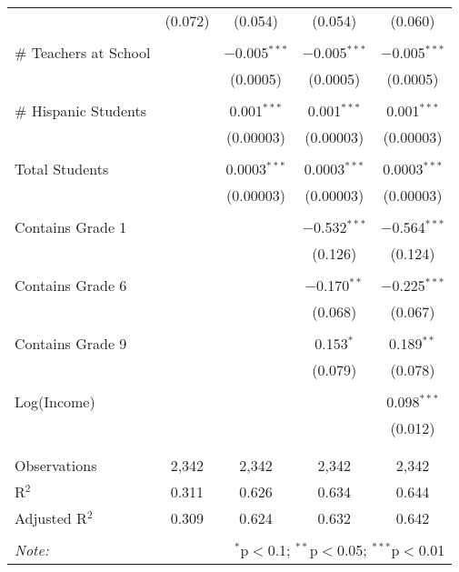 \begin{table}[!htbp]
\begin{tabular}{@{\extracolsep{-2pt}}lcccc}
  & (0.072) & (0.054) & (0.054) & (0.060) \\ 
  & & & & \\ 
 \# Teachers at School &  & $-$0.005$^{***}$ & $-$0.005$^{***}$ & $-$0.005$^{***}$ \\ 
  &  & (0.0005) & (0.0005) & (0.0005) \\ 
  & & & & \\ 
 \# Hispanic Students &  & 0.001$^{***}$ & 0.001$^{***}$ & 0.001$^{***}$ \\ 
  &  & (0.00003) & (0.00003) & (0.00003) \\ 
  & & & & \\ 
 Total Students &  & 0.0003$^{***}$ & 0.0003$^{***}$ & 0.0003$^{***}$ \\ 
  &  & (0.00003) & (0.00003) & (0.00003) \\ 
  & & & & \\ 
 Contains Grade 1 &  &  & $-$0.532$^{***}$ & $-$0.564$^{***}$ \\ 
  &  &  & (0.126) & (0.124) \\ 
  & & & & \\ 
 Contains Grade 6 &  &  & $-$0.170$^{**}$ & $-$0.225$^{***}$ \\ 
  &  &  & (0.068) & (0.067) \\ 
  & & & & \\ 
 Contains Grade 9 &  &  & 0.153$^{*}$ & 0.189$^{**}$ \\ 
  &  &  & (0.079) & (0.078) \\ 
  & & & & \\ 
 Log(Income) &  &  &  & 0.098$^{***}$ \\ 
  &  &  &  & (0.012) \\ 
  & & & & \\ 
\hline \\[-1.8ex] 
Observations & 2,342 & 2,342 & 2,342 & 2,342 \\ 
R$^{2}$ & 0.311 & 0.626 & 0.634 & 0.644 \\ 
Adjusted R$^{2}$ & 0.309 & 0.624 & 0.632 & 0.642 \\ 
\hline 
\hline \\[-1.8ex] 
\textit{Note:}  & \multicolumn{4}{r}{$^{*}$p$<$0.1; $^{**}$p$<$0.05; $^{***}$p$<$0.01} \\ 
\end{tabular} 
\end{table} 
